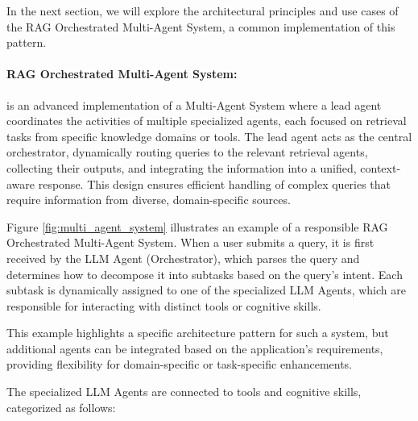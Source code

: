 \documentclass[12pt]{article}
\begin{document}
In the next section, we will explore the architectural principles and use cases of the RAG Orchestrated Multi-Agent System, a common implementation of this pattern.

\newpage

\paragraph{RAG Orchestrated Multi-Agent System:}
is an advanced implementation of a Multi-Agent System where a lead agent coordinates the activities of multiple specialized agents, each focused on retrieval tasks from specific knowledge domains or tools. The lead agent acts as the central orchestrator, dynamically routing queries to the relevant retrieval agents, collecting their outputs, and integrating the information into a unified, context-aware response. This design ensures efficient handling of complex queries that require information from diverse, domain-specific sources. 

Figure \ref{fig:multi_agent_system} illustrates an example of a responsible RAG Orchestrated Multi-Agent System. When a user submits a query, it is first received by the LLM Agent (Orchestrator), which parses the query and determines how to decompose it into subtasks based on the query's intent. Each subtask is dynamically assigned to one of the specialized LLM Agents, which are responsible for interacting with distinct tools or cognitive skills.

This example highlights a specific architecture pattern for such a system, but additional agents can be integrated based on the application's requirements, providing flexibility for domain-specific or task-specific enhancements.

The specialized LLM Agents are connected to tools and cognitive skills, categorized as follows:
\end{document}
